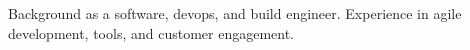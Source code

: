 

\begin{cvparagraph}

Background as a software, devops, and build engineer. Experience in agile development, tools, and customer engagement.
\end{cvparagraph}
